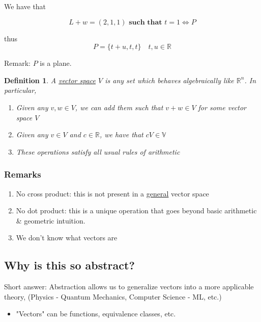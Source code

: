 \documentclass{article}
\newtheorem{definition}[theorem]{Definition}
\newtheorem{one minute paper}[theorem]{One Minute Paper}
\begin{document}
We have that 

\begin{equation}
    L + w = (2,1,1) \textbf{ such that } t = 1 \iff P
\end{equation}

thus
\begin{equation}
    P = \{t + u, t, t\} \quad t,u \in \mathbb{R}
\end{equation}

Remark: $P$ is a plane. 

\newpage

\begin{definition}
    A \underline{vector space} $V$ is any set which behaves algebraically like $\mathbb{R}^n$. In particular, 
    \begin{enumerate}
        \item Given any $v, w \in V$, we can add them such that $v + w \in V$ for some vector space $V$
        \item Given any $v \in V$ and $c \in \mathbb{R}$, we have that $cV \in \mathbb{V}$
        \item These operations satisfy all usual rules of arithmetic
    \end{enumerate}
\end{definition}

\subsubsection*{Remarks}
    \begin{enumerate}
        \item No cross product: this is not present in a \underline{general} vector space
        \item No dot product: this is a unique operation that goes beyond basic arithmetic \& geometric intuition.
        \item We don't know what vectors are
    \end{enumerate}

\subsection*{Why is this so abstract?}

Short answer: Abstraction allows us to generalize vectors into a more applicable theory, (Physics - Quantum Mechanics, Computer Science - ML, etc.) 

\begin{itemize}
    \item "Vectors" can be functions, equivalence classes, etc.
\end{itemize}
\end{document}
